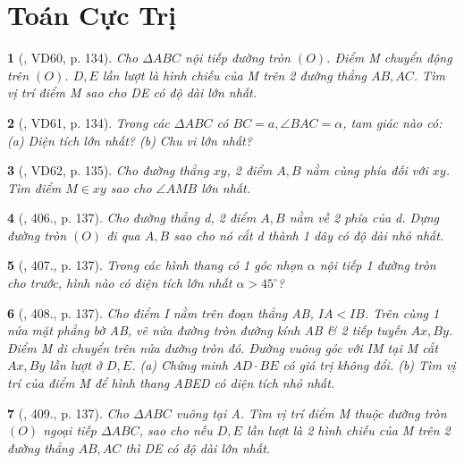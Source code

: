 \documentclass{article}
\newtheorem{baitoan}{}
\begin{document}

\section{Toán Cực Trị}

\begin{baitoan}[\cite{Binh_Toan_9_tap_2}, VD60, p. 134]
	Cho $\Delta ABC$ nội tiếp đường tròn $(O)$. Điểm M chuyển động trên $(O)$. $D,E$ lần lượt là hình chiếu của M trên 2 đường thẳng $AB,AC$. Tìm vị trí điểm M sao cho DE có độ dài lớn nhất.
\end{baitoan}

\begin{baitoan}[\cite{Binh_Toan_9_tap_2}, VD61, p. 134]
	Trong các $\Delta ABC$ có $BC = a,\angle{BAC} = \alpha$, tam giác nào có: (a) Diện tích lớn nhất? (b) Chu vi lớn nhất?
\end{baitoan}

\begin{baitoan}[\cite{Binh_Toan_9_tap_2}, VD62, p. 135]
	Cho đường thẳng $xy$, 2 điểm $A,B$ nằm cùng phía đối với $xy$. Tìm điểm $M\in xy$ sao cho $\angle{AMB}$ lớn nhất.
\end{baitoan}

\begin{baitoan}[\cite{Binh_Toan_9_tap_2}, 406., p. 137]
	Cho đường thẳng d, 2 điểm $A,B$ nằm về 2 phía của d. Dựng đường tròn $(O)$ đi qua $A,B$ sao cho nó cắt d thành 1 dây có độ dài nhỏ nhất.
\end{baitoan}

\begin{baitoan}[\cite{Binh_Toan_9_tap_2}, 407., p. 137]
	Trong các hình thang có 1 góc nhọn $\alpha$ nội tiếp 1 đường tròn cho trước, hình nào có diện tích lớn nhất $\alpha > 45^\circ$?
\end{baitoan}

\begin{baitoan}[\cite{Binh_Toan_9_tap_2}, 408., p. 137]
	Cho điểm I nằm trên đoạn thẳng AB, $IA < IB$. Trên cùng 1 nửa mặt phẳng bờ AB, vẽ nửa đường tròn đường kính AB \& 2 tiếp tuyến $Ax,By$. Điểm M di chuyển trên nửa đường tròn đó. Đường vuông góc với IM tại M cắt $Ax,By$ lần lượt ở $D,E$. (a) Chứng minh $AD\cdot BE$ có giá trị không đổi. (b) Tìm vị trí của điểm M để hình thang ABED có diện tích nhỏ nhất.
\end{baitoan}

\begin{baitoan}[\cite{Binh_Toan_9_tap_2}, 409., p. 137]
	Cho $\Delta ABC$ vuông tại A. Tìm vị trí điểm M thuộc đường tròn $(O)$ ngoại tiếp $\Delta ABC$, sao cho nếu $D,E$ lần lượt là 2 hình chiếu của M trên 2 đường thẳng $AB,AC$ thì DE có độ dài lớn nhất.
\end{baitoan}
\end{document}
